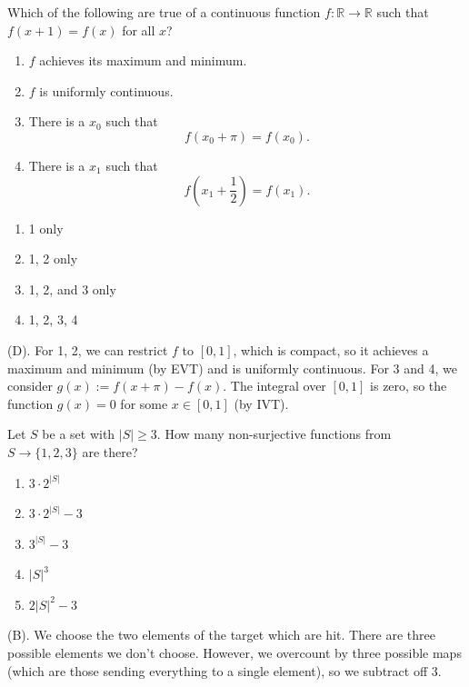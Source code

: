\begin{exercise}
Which of the following are true of a continuous function
$f:\mathbb{R}\to\mathbb{R}$ such that $f(x+1)=f(x)$ for all $x$?
\begin{enumerate}
    \item $f$ achieves its maximum and minimum.
    \item $f$ is uniformly continuous.
    \item There is a $x_0$ such that
    \[
    f(x_0+\pi)=f(x_0).
    \]
    \item There is a $x_1$ such that
    \[
    f\left(x_1+\frac{1}{2}\right)=f(x_1).
    \]
\end{enumerate}
\begin{enumerate}[label=(\Alph*)]
    \item 1 only
    \item 1, 2 only
    \item 1, 2, and 3 only
    \item 1, 2, 3, 4
\end{enumerate}
\end{exercise}
\begin{solution}
(D). For 1, 2, we can restrict $f$ to $[0,1]$, which is compact, so it achieves 
a maximum and minimum (by EVT) and is uniformly continuous. For 3 and 4, we consider
$g(x) := f(x + \pi) - f(x)$. The integral over $[0,1]$ is zero, so the function 
$g(x) = 0$ for some $x \in [0,1]$ (by IVT).
\end{solution}

\begin{exercise}
Let $S$ be a set with $|S| \geq 3$. How many non-surjective functions from
$S \to \{1,2,3\}$ are there?
\begin{enumerate}[label=(\Alph*)]
    \item $3\cdot 2^{|S|}$
    \item $3\cdot 2^{|S|}-3$
    \item $3^{|S|}-3$
    \item $|S|^3$
    \item $2|S|^2-3$
\end{enumerate}
\end{exercise}
\begin{solution}
(B). We choose the two elements of the target which are hit. 
There are three possible elements we don't choose. However, we overcount by three 
possible maps (which are those sending everything to a single element), so we subtract off 
$3$.
\end{solution}


